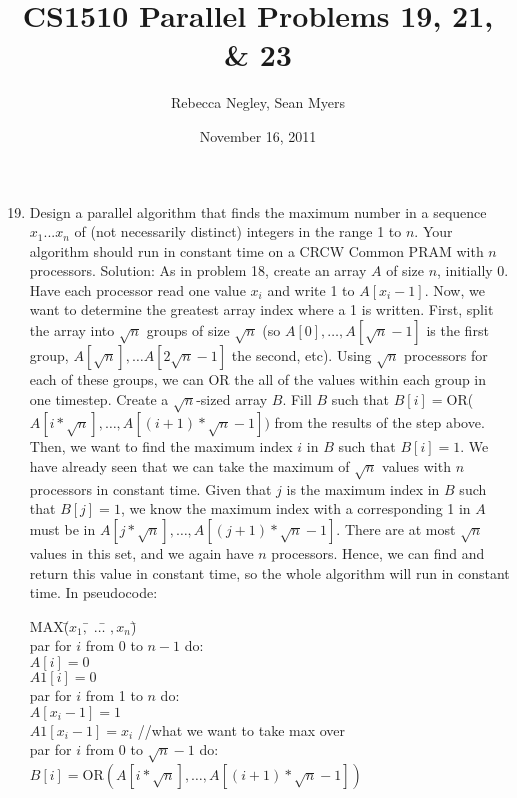 \documentclass{article}
\title{CS1510  Parallel Problems 19, 21, \& 23}
\author{Rebecca Negley, Sean Myers}
\date{November 16, 2011}
\begin{document}
\maketitle

\begin{enumerate}
\setcounter{enumi}{18}
\item Design a parallel algorithm that finds the maximum number in a sequence $x_1... x_n$ of (not necessarily distinct) integers in the range 1 to $n$. Your algorithm should run in constant time on a CRCW Common PRAM with $n$ processors.
\newline
\newline Solution: As in problem 18, create an array $A$ of size $n$, initially 0. Have each processor read one value $x_i$ and write 1 to $A[x_i-1]$. Now, we want to determine the greatest array index where a 1 is written. First, split the array into $\sqrt{n}$ groups of size $\sqrt{n}$ (so $A[0],\ldots ,A[\sqrt{n}-1]$ is the first group, $A[\sqrt{n}],\ldots A[2\sqrt{n}-1]$ the second, etc). Using $\sqrt{n}$ processors for each of these groups, we can OR the all of the values within each group in one timestep. Create a $\sqrt{n}$-sized array $B$. Fill $B$ such that $B[i]=$OR($A[i*\sqrt{n}],\ldots ,A[(i+1)*\sqrt{n}-1])$ from the results of the step above. Then, we want to find the maximum index $i$ in $B$ such that $B[i]=1$. We have already seen that we can take the maximum of $\sqrt{n}$ values with $n$ processors in constant time. Given that $j$ is the maximum index in $B$ such that $B[j]=1$, we know the maximum index with a corresponding 1 in $A$ must be in $A[j*\sqrt{n}],\ldots ,A[(j+1)*\sqrt{n}-1]$. There are at most $\sqrt{n}$ values in this set, and we again have $n$ processors. Hence, we can find and return this value in constant time, so the whole algorithm will run in constant time. In pseudocode:
\begin{tabbing}
MAX\= ($x_1,$\= $\ldots $\= $,x_n$\= )\\
\>par for $i$ from 0 to $n-1$ do:\\
\>\>$A[i]=0$\\
\>\>$A1[i]=0$\\
\>par for $i$ from 1 to $n$ do:\\
\>\>$A[x_i-1]=1$\\
\>\>$A1[x_i-1]=x_i$ //what we want to take max over\\
\>par for $i$ from 0 to $\sqrt{n}-1$ do:\\
\>\>$B[i]=$OR$(A[i*\sqrt{n}],\ldots ,A[(i+1)*\sqrt{n}-1])$\\

\end{tabbing}
\end{enumerate}
\end{document}
